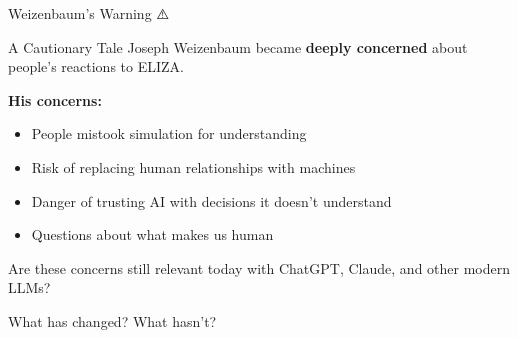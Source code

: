 \documentclass[aspectratio=169]{beamer}
\begin{document}
\begin{frame}{Weizenbaum's Warning ⚠️}
\small
\begin{alertblock}{A Cautionary Tale}
Joseph Weizenbaum became \textbf{deeply concerned} about people's reactions to ELIZA.
\end{alertblock}

\vspace{0.3cm}

\textbf{His concerns:}
\begin{itemize}\setlength{\itemsep}{0pt}
    \item People mistook simulation for understanding
    \item Risk of replacing human relationships with machines
    \item Danger of trusting AI with decisions it doesn't understand
    \item Questions about what makes us human
\end{itemize}

\vspace{0.3cm}

\begin{discussion}
Are these concerns still relevant today with ChatGPT, Claude, and other modern LLMs?

What has changed? What hasn't?
\end{discussion}
\end{frame}
\end{document}
